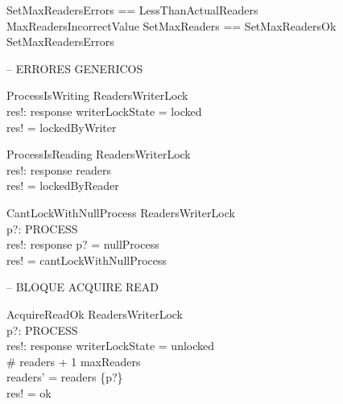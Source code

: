 \documentclass{article}
\begin{document}


\begin{zed}
SetMaxReadersErrors == LessThanActualReaders  \\
\quad \lor MaxReadersIncorrectValue
\also
SetMaxReaders == SetMaxReadersOk \lor SetMaxReadersErrors
\end{zed}

-- ERRORES GENERICOS
\begin{schema}{ProcessIsWriting}
    \Xi ReadersWriterLock \\
    res!: response
\where
    writerLockState = locked \\
    res! = lockedByWriter
\end{schema}

\begin{schema}{ProcessIsReading}
    \Xi ReadersWriterLock \\
    res!: response
\where
    readers \neq \emptyset \\
    res! = lockedByReader
\end{schema}

\begin{schema}{CantLockWithNullProcess}
    \Xi ReadersWriterLock \\
    p?: PROCESS \\
    res!: response
\where
    p? = nullProcess \\
    res! = cantLockWithNullProcess
\end{schema}

-- BLOQUE ACQUIRE READ

\begin{schema}{AcquireReadOk}
    \Delta ReadersWriterLock \\
    p?: PROCESS \\
    res!: response
\where
    writerLockState = unlocked \\
    \# readers + 1 \leq maxReaders \\
    readers' = readers \cup \{p?\} \\
    res! = ok
\end{schema}
\end{document}
